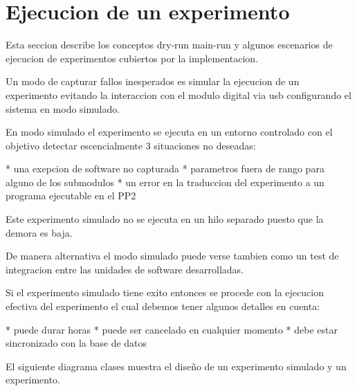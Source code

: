 \section{Ejecucion de un experimento}

Esta seccion describe los conceptos dry-run main-run y algunos escenarios de ejecucion de
experimentos cubiertos por la implementacion.


Un modo de capturar fallos inesperados es simular la ejecucion de un experimento evitando 
la interaccion con el modulo digital via usb configurando el sistema en modo simulado.

En modo simulado el experimento se ejecuta en un entorno controlado con el objetivo detectar
escencialmente 3 situaciones no deseadas:

* una exepcion de software no capturada
* parametros fuera de rango para alguno de los submodulos
* un error en la traduccion del experimento a un programa ejecutable en el PP2

Este experimento simulado no se ejecuta en un hilo separado puesto que la demora es baja.

De manera alternativa el modo simulado puede verse tambien como un test de integracion
entre las unidades de software desarrolladas.

Si el experimento simulado tiene exito entonces se procede con la ejecucion efectiva del experimento
el cual debemos tener algunos detalles en cuenta:

* puede durar horas
* puede ser cancelado en cualquier momento
* debe estar sincronizado con la base de datos

El siguiente diagrama clases muestra el diseño de un experimento simulado y un experimento.

\newpage